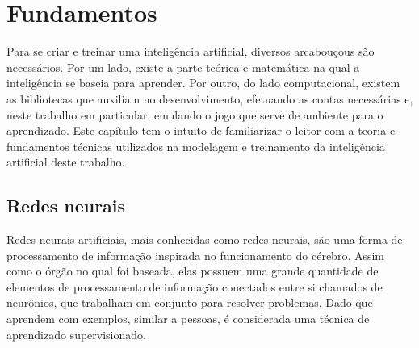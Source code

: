 %



\chapter{Fundamentos}
\label{cap:fundamentos}

Para se criar e treinar uma inteligência artificial, diversos arcabouçous são necessários.
Por um lado, existe a parte teórica e matemática na qual a inteligência se baseia para aprender. 
Por outro, do lado computacional, existem as bibliotecas que auxiliam no desenvolvimento, efetuando as contas necessárias e, neste trabalho em particular, emulando o jogo que serve de ambiente para o aprendizado.
Este capítulo tem o intuito de familiarizar o leitor com a teoria e fundamentos técnicas utilizados na modelagem e treinamento da inteligência artificial deste trabalho.


\section{Redes neurais}
\label{sec:nn}

Redes neurais artificiais, mais conhecidas como redes neurais, são uma forma de processamento de informação inspirada no funcionamento do cérebro.
Assim como o órgão no qual foi baseada, elas possuem uma grande quantidade de elementos de processamento de informação conectados entre si chamados de neurônios, que trabalham em conjunto para resolver problemas.
Dado que aprendem com exemplos, similar a pessoas, é considerada uma técnica de aprendizado supervisionado.

